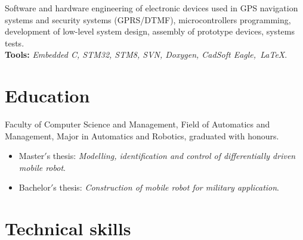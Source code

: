 \documentclass[11pt,a4paper,sans]{moderncv} %
\begin{document}
{Software and hardware engineering of electronic devices used in GPS navigation systems and security systems
(GPRS/DTMF), microcontrollers programming, development of low-level system design, assembly of prototype
devices, systems tests. \\ \textbf{Tools:} \textit{Embedded C, STM32, STM8, SVN, Doxygen, CadSoft Eagle,~\LaTeX}.}



\section{Education}

{Faculty of Computer Science and Management, Field of Automatics and Management, Major in Automatics and Robotics,
graduated with honours.
\begin{itemize}
\item Master$'$s thesis: \textit{Modelling, identification and control of differentially driven mobile robot}.
\item Bachelor$'$s thesis: \textit{Construction of mobile robot for military application}.
\end{itemize}}



\section{Technical skills}



\end{document}

